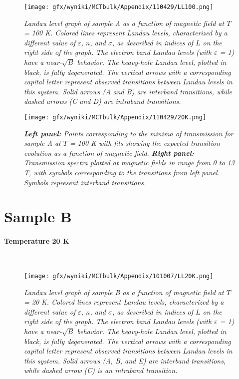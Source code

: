 \documentclass[titlepage,a4paper]{book}
\newcommand{\myparagraph}[1]{\paragraph{#1}\mbox{}\\}
\begin{document}
\begin{figure}[ht]
	\centering
	\texttt{[image: gfx/wyniki/MCTbulk/Appendix/110429/LL100.png]}
	\vspace{-10pt}
	\caption{\textit{Landau level graph of sample A as a function of magnetic field at $T$ = 100 K. Colored lines represent Landau levels, characterized by a different value of $\varepsilon$, $n$, and $\sigma$, as described in indices of $L$ on the right side of the graph. The electron band Landau levels (with $\varepsilon$ = 1) have a near-$\sqrt{B}$ behavior. The heavy-hole Landau level, plotted in black, is fully degenerated. The vertical arrows with a corresponding capital letter represent observed transitions between Landau levels in this system. Solid arrows (A and B) are interband transitions, while dashed arrows (C and D) are intraband transitions.}}
	\label{fig:LL_110429_100K}
\end{figure}
\begin{figure}[ht]
	\centering
	\texttt{[image: gfx/wyniki/MCTbulk/Appendix/110429/20K.png]}
	\vspace{-10pt}
	\caption{\textit{\textbf{Left panel:} Points corresponding to the minima of transmission for sample A at $T$ = 100 K with fits showing the expected transition evolution as a function of magnetic field. \textbf{Right panel:} Transmission spectra plotted at magnetic fields in range from 0 to 13 T, with symbols corresponding to the transitions from left panel. Symbols represent interband transitions.}}
	\label{fig:Spectra_110429_100K}
\end{figure} 

\clearpage
\section{Sample B}
\myparagraph{Temperature 20 K}
\begin{figure}[H]
	\centering
	\texttt{[image: gfx/wyniki/MCTbulk/Appendix/101007/LL20K.png]}
	\vspace{-10pt}
	\caption{\textit{Landau level graph of sample B as a function of magnetic field at $T$ = 20 K. Colored lines represent Landau levels, characterized by a different value of $\varepsilon$, $n$, and $\sigma$, as described in indices of $L$ on the right side of the graph. The electron band Landau levels (with $\varepsilon$ = 1) have a near-$\sqrt{B}$ behavior. The heavy-hole Landau level, plotted in black, is fully degenerated. The vertical arrows with a corresponding capital letter represent observed transitions between Landau levels in this system. Solid arrows (A, B, and E) are interband transitions, while dashed arrow (C) is an intraband transition.}}
	\label{fig:LL_101007_20K}
\end{figure}
\end{document}
